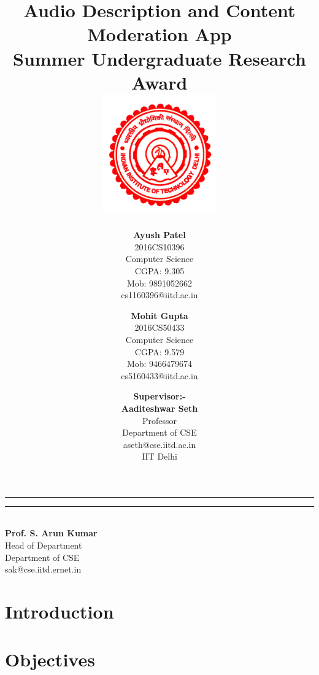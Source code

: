 \documentclass[11pt]{article}
\title{\vspace*{\fill} \textbf{Audio Description and Content Moderation App}
	  \\ {\large \textbf{Summer Undergraduate Research Award}}
	  \\  \vspace{3mm} \includegraphics[width=5cm]{logo.jpg}}
\author{
	\textbf{Ayush Patel}\\ 
	2016CS10396\\
	Computer Science\\
	CGPA: 9.305 \\
	Mob: 9891052662\\
	cs1160396@iitd.ac.in
	\and
	\textbf{Mohit Gupta}\\ 
	2016CS50433\\
	Computer Science\\
	CGPA: 9.579\\
	Mob: 9466479674\\
	cs5160433@iitd.ac.in
}
\date{\textbf{Supervisor:-} \\ \textbf{Aaditeshwar Seth} \\ Professor \\ Department of CSE \\ aseth@cse.iitd.ac.in\\ IIT Delhi\\
\vspace*{\fill}}
\begin{document}
	\maketitle

\begin{center}
\noindent\rule{3.2cm}{0.4pt} 
\end{center}

\begin{flushright}
\noindent\rule{3.2cm}{0.4pt} 
\\ \textbf{Prof. S. Arun Kumar}
\\ Head of Department
\\ Department of CSE
\\ sak@cse.iitd.ernet.in
\end{flushright}


	\newpage

	\section{Introduction}



	\section{Objectives}
\end{document}
